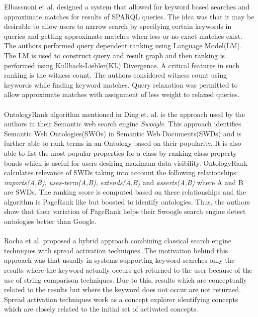 \documentclass[runningheads,a4paper]{libtex/llncs}
\begin{document}
Elbassuoni et al.\cite{elbassuoni2009language} designed a system that allowed for keyword based searches and approximate matches for results of SPARQL queries. The idea was that it may be desirable to allow users to narrow search by specifying certain keywords in queries and getting approximate matches when less or no exact matches exist. The authors performed query dependent ranking using Language Model(LM). The LM is used to construct query and result graph and then ranking is performed using Kullback-Liebler(KL) Divergence. A critical features in such ranking is the witness count. The authors considered witness count using keywords while finding keyword matches. Query relaxation was permitted to allow approximate matches with assignment of less weight to relaxed queries.
\\\\
OntologyRank algorithm mentioned in Ding et. al.\cite{ding2005finding} is the approach used by the authors in their Semantic web search engine \emph{Swoogle}. This approach identifies Semantic Web Ontologies(SWOs) in Semantic Web Documents(SWDs) and is further able to rank terms in an Ontology based on their popularity. It is also able to list the most popular properties for a class by ranking class-property bonds which is useful for users desiring maximum data visibility. OntologyRank calculates relevance of SWDs taking into account the following relationships: \emph{imports(A,B)}, \emph{uses-term(A,B)}, \emph{extends(A,B)} and \emph{asserts(A,B)} where A and B are SWDs. The ranking score is computed based on these relationships and the algorithm is PageRank like but boosted to identify ontologies. Thus, the authors show that their variation of PageRank helps their Swoogle search engine detect ontologies better than Google.
\\\\
Rocha et al.\cite{rocha2004hybrid} proposed a hybrid approach combining classical search engine techniques with spread activation techniques. The motivation behind this approach was that usually in systems supporting keyword searches only the results where the keyword actually occurs get returned to the user because of the use of string comparison techniques. Due to this, results which are conceptually related to the results but where the keyword does not occur are not returned. Spread activation techniques work as a concept explorer identifying concepts which are closely related to the initial set of activated concepts.
\\\\
\end{document}
